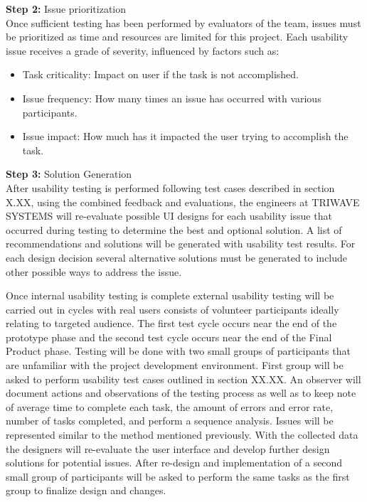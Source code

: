 \textbf{Step 2:} Issue prioritization\\
\medskip
Once sufficient testing has been performed by evaluators of the team, issues must be prioritized as time and resources are limited for this project. Each usability issue receives a grade of severity, influenced by factors such as:
\begin{itemize}
\setlength\itemsep{0.1mm}
	\item Task criticality: Impact on user if the task is not accomplished.
	\item Issue frequency: How many times an issue has occurred with various participants.
	\item Issue impact: How much has it impacted the user trying to accomplish the task.
\end{itemize}

\bigskip



\textbf{Step 3:} Solution Generation\\
\medskip
After usability testing is performed following test cases described in section X.XX, using the combined feedback and evaluations, the engineers at TRIWAVE SYSTEMS will re-evaluate possible UI designs for each usability issue that occurred during testing to determine the best and optional solution. A list of recommendations and solutions will be generated with usability test results. For each design decision several alternative solutions must be generated to include other possible ways to address the issue. 

\pagebreak

Once internal usability testing is complete external usability testing will be carried out in cycles with real users consists of volunteer participants ideally relating to targeted audience. The first test cycle occurs near the end of the prototype phase and the second test cycle occurs near the end of the Final Product phase. Testing will be done with two small groups of participants that are unfamiliar with the project development environment. First group will be asked to perform usability test cases outlined in section XX.XX. An observer will document actions and observations of the testing process as well as to keep note of average time to complete each task, the amount of errors and error rate, number of tasks completed, and perform a sequence analysis. Issues will be represented similar to the method mentioned previously. With the collected data the designers will re-evaluate the user interface and develop further design solutions for potential issues. After re-design and implementation of a second small group of participants will be asked to perform the same tasks as the first group to finalize design and changes.

